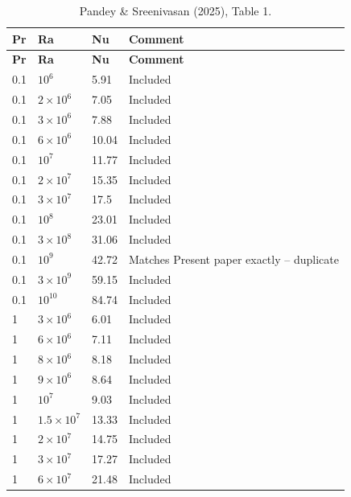 \documentclass[11pt]{article}
\begin{document}
\begin{longtable}{l l l l}
\caption{Pandey \& Sreenivasan (2025), Table 1.}\label{tab:ps2025}\\
\toprule
\textbf{Pr} & \textbf{Ra} & \textbf{Nu} & \textbf{Comment} \\
\midrule
\endfirsthead
\toprule
\textbf{Pr} & \textbf{Ra} & \textbf{Nu} & \textbf{Comment} \\
\midrule
\endhead
\bottomrule
\endfoot
\rowcolor{included} 0.1 & $10^{6}$ & 5.91 & Included \\
\rowcolor{included} 0.1 & $2\times10^{6}$ & 7.05 & Included \\
\rowcolor{included} 0.1 & $3\times10^{6}$ & 7.88 & Included \\
\rowcolor{included} 0.1 & $6\times10^{6}$ & 10.04 & Included \\
\rowcolor{included} 0.1 & $10^{7}$ & 11.77 & Included \\
\rowcolor{included} 0.1 & $2\times10^{7}$ & 15.35 & Included \\
\rowcolor{included} 0.1 & $3\times10^{7}$ & 17.5 & Included \\
\rowcolor{included} 0.1 & $10^{8}$ & 23.01 & Included \\
\rowcolor{included} 0.1 & $3\times10^{8}$ & 31.06 & Included \\
\rowcolor{excluded} 0.1 & $10^{9}$ & 42.72 & Matches Present paper exactly -- duplicate \\
\rowcolor{included} 0.1 & $3\times10^{9}$ & 59.15 & Included \\
\rowcolor{included} 0.1 & $10^{10}$ & 84.74 & Included \\
\rowcolor{included} 1 & $3\times10^{6}$ & 6.01 & Included \\
\rowcolor{included} 1 & $6\times10^{6}$ & 7.11 & Included \\
\rowcolor{included} 1 & $8\times10^{6}$ & 8.18 & Included \\
\rowcolor{included} 1 & $9\times10^{6}$ & 8.64 & Included \\
\rowcolor{included} 1 & $10^{7}$ & 9.03 & Included \\
\rowcolor{included} 1 & $1.5\times10^{7}$ & 13.33 & Included \\
\rowcolor{included} 1 & $2\times10^{7}$ & 14.75 & Included \\
\rowcolor{included} 1 & $3\times10^{7}$ & 17.27 & Included \\
\rowcolor{included} 1 & $6\times10^{7}$ & 21.48 & Included \\

\end{longtable}
\end{document}
